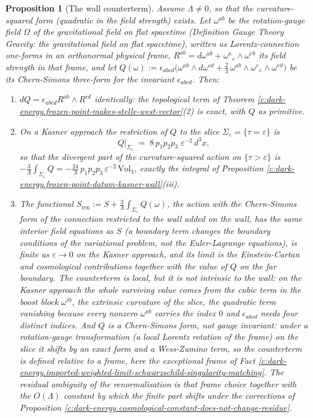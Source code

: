 \documentclass[11pt]{article}
\newtheorem{proposition}[theorem]{Proposition}
\theoremstyle{definition}
\theoremstyle{plain}
\newcommand{\changedmark}[2]{\marginpar{\raggedright\scriptsize\color{#1}#2}}
\begin{document}
\begin{proposition}[The wall counterterm]\label{c:dark-energy.wall-counterterm}
\changedmark{gray}{reworded}
Assume $\Lambda \neq 0$, so that the curvature-squared form (quadratic in the field strength) exists. Let $\omega^{ab}$ be the rotation-gauge field $\Omega$ of the gravitational field on flat spacetime (Definition \emph{Gauge Theory Gravity: the gravitational field on flat spacetime}), written as Lorentz-connection one-forms in an orthonormal physical frame, $R^{ab} = d\omega^{ab} + \omega^{a}{}_{e}\wedge\omega^{eb}$ its field strength in that frame, and let $Q(\omega) := \epsilon_{abcd}\bigl(\omega^{ab}\wedge d\omega^{cd} + \tfrac23\,\omega^{ab}\wedge\omega^{c}{}_{e}\wedge\omega^{ed}\bigr)$ be its Chern-Simons three-form for the invariant $\epsilon_{abcd}$. Then:
\begin{enumerate}
\item[(i)] $dQ = \epsilon_{abcd}R^{ab}\wedge R^{cd}$ identically: the topological term of Theorem \ref{c:dark-energy.frozen-point-makes-stelle-west-vector}(2) is exact, with $Q$ as primitive.
\item[(ii)] On a Kasner approach the restriction of $Q$ to the slice $\Sigma_\varepsilon = \{\tau = \varepsilon\}$ is
\[
Q\big|_{\Sigma_\varepsilon} \;=\; 8\,p_1p_2p_3\;\varepsilon^{-2}\, d^3x ,
\]
so that the divergent part of the curvature-squared action on $\{\tau > \varepsilon\}$ is $-\tfrac{3}{\Lambda}\int_{\Sigma_\varepsilon}Q = -\tfrac{24}{\Lambda}\,p_1p_2p_3\,\varepsilon^{-2}\,\mathrm{Vol}_3$, exactly the integral of Proposition \ref{c:dark-energy.frozen-point-datum-kasner-wall}(iii).
\item[(iii)] The functional $S_{\mathrm{ren}} := S + \tfrac{3}{\Lambda}\int_{\Sigma_\varepsilon}Q(\omega)$, the action with the Chern-Simons form of the connection restricted to the wall added on the wall, has the same interior field equations as $S$ (a boundary term changes the boundary conditions of the variational problem, not the Euler-Lagrange equations), is finite as $\varepsilon \to 0$ on the Kasner approach, and its limit is the Einstein-Cartan and cosmological contributions together with the value of $Q$ on the far boundary. The counterterm is local, but it is not intrinsic to the wall: on the Kasner approach the whole surviving value comes from the cubic term in the boost block $\omega^{i0}$, the extrinsic curvature of the slice, the quadratic term vanishing because every nonzero $\omega^{ab}$ carries the index $0$ and $\epsilon_{abcd}$ needs four distinct indices. And $Q$ is a Chern-Simons form, not gauge invariant: under a rotation-gauge transformation (a local Lorentz rotation of the frame) on the slice it shifts by an exact form and a Wess-Zumino term, so the counterterm is defined relative to a frame, here the exceptional frame of Fact \ref{c:dark-energy.imported-weighted-limit-schwarzschild-singularity-matching}. The residual ambiguity of the renormalisation is that frame choice together with the $O(\Lambda)$ constant by which the finite part shifts under the corrections of Proposition \ref{c:dark-energy.cosmological-constant-does-not-change-residue}.

\end{enumerate}
\end{proposition}
\end{document}
